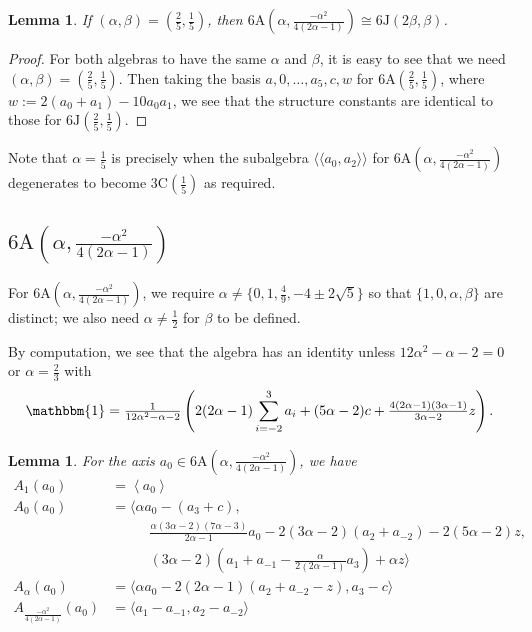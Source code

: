 \documentclass[11pt, a4paper]{article}
\theoremstyle{plain}
\newtheorem{lemma}[theorem]{Lemma}
\theoremstyle{definition}
\newcommand\al{\alpha}
\newcommand\bt{\beta}
\newcommand\la{\langle}
\newcommand\ra{\rangle}
\newcommand\lla{\langle\!\langle}
\newcommand\rra{\rangle\!\rangle}
\newcommand{\A}{\mathrm{A}}
\newcommand{\C}{\mathrm{C}}
\newcommand{\J}{\mathrm{J}}
\newcommand{\0}{\overline{0}}
\newcommand{\2}{\overline{2}}
\newcommand{\1}{\mathbbm{1}}
\begin{document}
\begin{lemma}
If $(\al, \bt) = (\frac{2}{5}, \frac{1}{5})$, then $6\A(\al, \frac{-\al^2}{4(2\al-1)}) \cong 6\J(2\bt, \bt)$.
\end{lemma}
\begin{proof}
For both algebras to have the same $\al$ and $\bt$, it is easy to see that we need $(\al, \bt) = (\frac{2}{5}, \frac{1}{5})$.  Then taking the basis $a, 0, \dots, a_5, c, w$ for $6\A(\frac{2}{5}, \frac{1}{5})$, where $w := 2(a_0+a_1) - 10a_0a_1$, we see that the structure constants are identical to those for $6\J(\frac{2}{5}, \frac{1}{5})$.
\end{proof}

Note that $\al = \frac{1}{5}$ is precisely when the subalgebra $\lla a_0, a_2 \rra$ for $6\A(\al, \frac{-\al^2}{4(2\al-1)})$ degenerates to become $3\C(\frac{1}{5})$ as required.


\subsection{$6\A\left(\al, \frac{-\al^2}{4(2\al-1)}\right)$}


For $6\A(\al, \frac{-\al^2}{4(2\al-1)})$, we require $\al  \neq \{0,1, \frac{4}{9}, -4 \pm 2\sqrt{5}\}$ so that $\{1,0,\al,\bt\}$ are distinct; we also need $\al \neq \frac{1}{2}$ for $\bt$ to be defined.

By computation, we see that the algebra has an identity unless $12\al^2-\al-2=0$ or $\al=\frac{2}{3}$ with	
	\[
	\1 = \tfrac{1}{12\al^2-\al-2} \left(2(2\al-1)\sum_{i=-2}^{3}a_i + (5\al-2)c + \tfrac{4(2\al-1)(3\al-1)}{3\al-2}z\right).
	\]
	
	  




\begin{lemma}
	For the axis $a_0 \in 6\A\left(\al,\frac{-\al^2}{4(2\al-1)}\right)$, we have
	\begin{align*}
		A_1(a_0) &= \left\la a_0 \right\ra  \\
		A_0(a_0) &= \la \al a_0 - (a_3 + c), \\
		&\phantom{{}={} \la} \quad \tfrac{\al(3\al-2)(7\al-3)}{2\al-1} a_0 - 2(3\al-2)(a_2 +a_{-2}) - 2(5\al-2)z,\\
		&\phantom{{}={} \la} \quad (3\al-2)(a_1+a_{-1} - \tfrac{\al}{2(2\al-1)}a_3) + \al z \ra\\
		A_\al(a_0) &= \la \al a_0 - 2(2\al-1)(a_2 +  a_{-2} -z), a_3 - c\ra \\
		A_{\frac{-\al^2}{4(2\al-1)}}(a_0) &= \la a_1 - a_{-1}, a_2-a_{-2} \ra 
	\end{align*}
\end{lemma}
\end{document}
